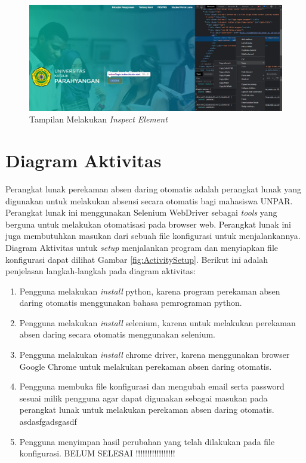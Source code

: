 \begin{figure}[H]
	\centering
	\includegraphics[scale=0.3]{Gambar/elemen.jpg}
	\caption{Tampilan Melakukan \textit{Inspect Element}} 
	\label{fig:inspect}
\end{figure}	

\section{Diagram Aktivitas}
\label{sec:diagramAktivitas}
Perangkat lunak perekaman absen daring otomatis adalah perangkat lunak yang digunakan untuk melakukan absensi secara otomatis bagi mahasiswa UNPAR. Perangkat lunak ini menggunakan Selenium WebDriver sebagai \textit{tools} yang berguna untuk melakukan otomatisasi pada browser web. Perangkat lunak ini juga membutuhkan masukan dari sebuah file konfigurasi untuk menjalankannya.
Diagram Aktivitas untuk \textit{setup} menjalankan program dan menyiapkan file konfigurasi dapat dilihat Gambar \ref{fig:ActivitySetup}. Berikut ini adalah penjelasan langkah-langkah pada diagram aktivitas:
\begin{enumerate}
	\item Pengguna melakukan \textit{install} python, karena program perekaman absen daring otomatis menggunakan bahasa pemrograman python.
	\item Pengguna melakukan \textit{install} selenium, karena untuk melakukan perekaman absen daring secara otomatis menggunakan selenium.
	\item Pengguna melakukan \textit{install} chrome driver, karena menggunakan browser Google Chrome untuk melakukan perekaman absen daring otomatis.
	\item Pengguna membuka file konfigurasi dan mengubah email serta password sesuai milik pengguna agar dapat digunakan sebagai masukan pada perangkat lunak untuk melakukan perekaman absen daring otomatis.
	asdasfgadsgasdf
	\item Pengguna menyimpan hasil perubahan yang telah dilakukan pada file konfigurasi. BELUM SELESAI !!!!!!!!!!!!!!!!!
\end{enumerate}
